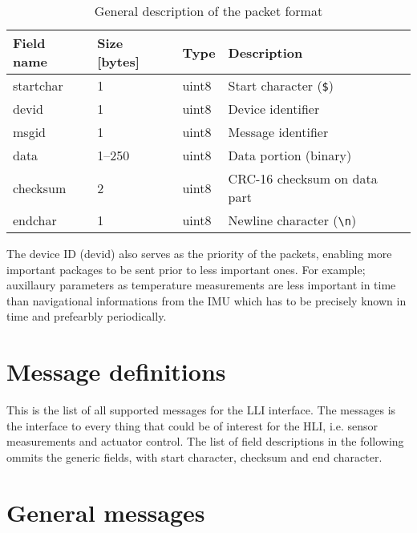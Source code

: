 
\begin{table}[htbp]
	\centering
	\begin{tabular}{llll}
		\toprule
		\textbf{Field name} & \textbf{Size [bytes]} & \textbf{Type} & \textbf{Description}\\
		\midrule
		startchar & 1 & uint8 & Start character (\texttt{\$}) \\
		devid & 1 & uint8 & Device identifier \\
		msgid & 1 & uint8 & Message identifier \\
		data & 1--250 & uint8 & Data portion (binary)\\
		checksum & 2 & uint8 & CRC-16 checksum on data part \\
		endchar & 1 & uint8 & Newline character (\texttt{\textbackslash n})\\
		\bottomrule
	\end{tabular}
	\caption{General description of the packet format}
	\label{tab:general}
\end{table}

The device ID (devid) also serves as the priority of the packets, enabling more important packages to be sent prior to less important ones. For example; auxillaury parameters as temperature measurements are less important in time than navigational informations from the \ac{IMU} which has to be precisely known in time and prefearbly periodically.

\section{Message definitions}
This is the list of all supported messages for the LLI interface. The messages is the interface to every thing that could be of interest for the HLI, i.e. sensor measurements and actuator control. The list of field descriptions in the following ommits the generic fields, with start character, checksum and end character.

\section{General messages}

